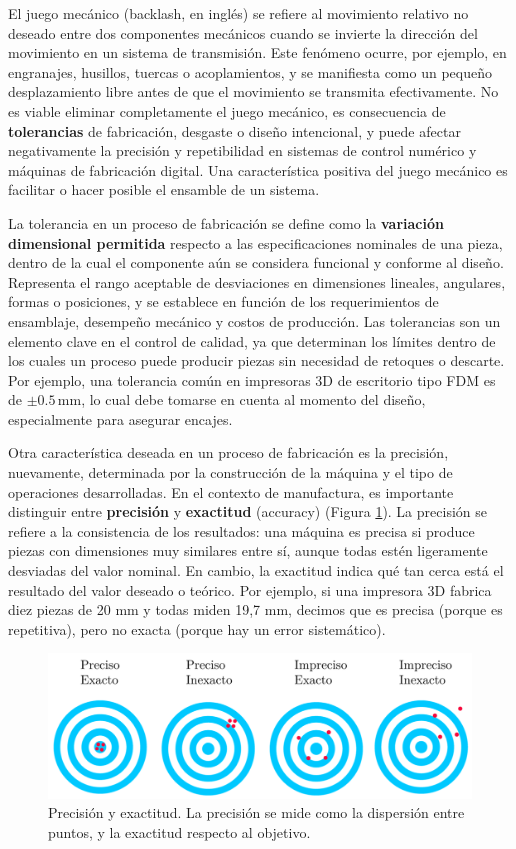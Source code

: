 El juego mecánico (backlash, en inglés) se refiere al movimiento relativo no deseado entre dos componentes mecánicos cuando se invierte la dirección del movimiento en un sistema de transmisión. Este fenómeno ocurre, por ejemplo, en engranajes, husillos, tuercas o acoplamientos, y se manifiesta como un pequeño desplazamiento libre antes de que el movimiento se transmita efectivamente. No es viable eliminar completamente el juego mecánico, es consecuencia de \textbf{tolerancias} de fabricación, desgaste o diseño intencional, y puede afectar negativamente la precisión y repetibilidad en sistemas de control numérico y máquinas de fabricación digital. Una característica positiva del juego mecánico es facilitar o hacer posible el ensamble de un sistema.

La tolerancia en un proceso de fabricación se define como la \textbf{variación dimensional permitida} respecto a las especificaciones nominales de una pieza, dentro de la cual el componente aún se considera funcional y conforme al diseño. Representa el rango aceptable de desviaciones en dimensiones lineales, angulares, formas o posiciones, y se establece en función de los requerimientos de ensamblaje, desempeño mecánico y costos de producción. Las tolerancias son un elemento clave en el control de calidad, ya que determinan los límites dentro de los cuales un proceso puede producir piezas sin necesidad de retoques o descarte. Por ejemplo, una tolerancia común en impresoras 3D de escritorio tipo FDM es de $\pm 0.5 \,\mathrm{mm}$, lo cual debe tomarse en cuenta al momento del diseño, especialmente para asegurar encajes.

Otra característica deseada en un proceso de fabricación es la precisión, nuevamente, determinada por la construcción de la máquina y el tipo de operaciones desarrolladas. En el contexto de manufactura, es importante distinguir entre \textbf{precisión} y \textbf{exactitud} (accuracy) (Figura \ref{press1}). La precisión se refiere a la consistencia de los resultados: una máquina es precisa si produce piezas con dimensiones muy similares entre sí, aunque todas estén ligeramente desviadas del valor nominal. En cambio, la exactitud indica qué tan cerca está el resultado del valor deseado o teórico. Por ejemplo, si una impresora 3D fabrica diez piezas de 20 mm y todas miden 19,7 mm, decimos que es precisa (porque es repetitiva), pero no exacta (porque hay un error sistemático).

\begin{figure}[h!]
    \centering
    \includegraphics[width=0.9\linewidth]{imgs/press.png}
    \caption{Precisión y exactitud. La precisión se mide como la dispersión entre puntos, y la exactitud respecto al objetivo.}
    \label{press1}
\end{figure}


